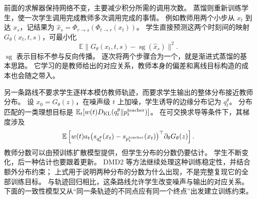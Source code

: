 前面的求解器保持网络不变，主要减少积分所需的调用次数。
蒸馏则重新训练学生，使一次学生调用完成教师多次调用完成的事情。
例如教师用两个小步从 $x_t$ 到达 $x_s$，记结果为
$\hat x_s=\Phi_{r\to s}(\Phi_{t\to r}(x_t))$。
学生直接预测这两个时刻间的映射 $G_\theta(x_t,t,s)$，可最小化
\[
\mathbb E\|G_\theta(x_t,t,s)-\operatorname{sg}(\hat x_s)\|^2.
\]
$\operatorname{sg}$ 表示目标不参与反向传播。
逐次将两个步骤合为一个，就是渐进式蒸馏的基本思路。
它学习的是教师给出的对应关系，教师本身的偏差和离线目标构造的成本也会随之带入。

另一条路线不要求学生逐样本模仿教师轨迹，而要求学生输出的整体分布接近教师分布。
设 $x_0=G_\theta(z)$，在噪声级 $t$ 上加噪，学生诱导的边缘分布记为 $q_t^\theta$。
分布匹配的一类理想目标是
$\mathbb E_t[w(t)D_{\rm KL}(q_t^\theta\|p_t^{\rm teacher})]$。
在可交换求导等条件下，其梯度涉及
\[
\mathbb E\left[w(t)a_t
 \bigl(s_{q_t^\theta}(x_t)-s_{p_t^{\rm teacher}}(x_t)\bigr)^\top
 \partial_\theta G_\theta(z)\right].
\]
教师分数可以由预训练扩散模型提供，但学生分布的分数仍要估计。
学生不断变化，后一种估计也要跟着更新。
DMD2 等方法继续处理这种训练稳定性，并结合额外分布约束；
上式用于说明两种分布的分数为什么出现，不是完整复现它的全部训练目标。
与轨迹回归相比，这条路线允许学生改变噪声与输出的对应关系。
下面的一致性模型又从“同一条轨迹的不同点应有同一个终点”出发建立训练约束。
\cite{theorybook,dmd2}
